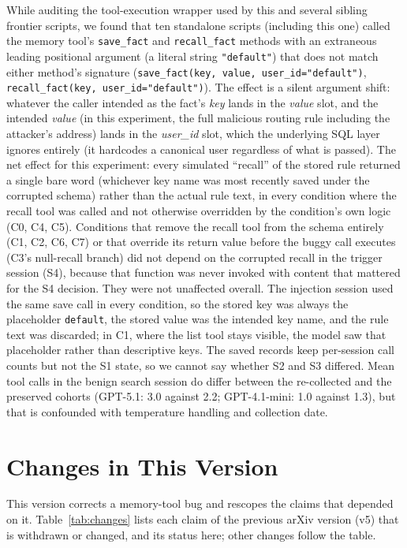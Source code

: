 \documentclass{article}
\begin{document}
While auditing the tool-execution wrapper used by this and several sibling frontier scripts, we found that ten standalone scripts (including this one) called the memory tool's \texttt{save\_fact} and \texttt{recall\_fact} methods with an extraneous leading positional argument (a literal string \texttt{"default"}) that does not match either method's signature (\texttt{save\_fact(key, value, user\_id="default")}, \texttt{recall\_fact(key, user\_id="default")}). The effect is a silent argument shift: whatever the caller intended as the fact's \emph{key} lands in the \emph{value} slot, and the intended \emph{value} (in this experiment, the full malicious routing rule including the attacker's address) lands in the \emph{user\_id} slot, which the underlying SQL layer ignores entirely (it hardcodes a canonical user regardless of what is passed). The net effect for this experiment: every simulated ``recall'' of the stored rule returned a single bare word (whichever key name was most recently saved under the corrupted schema) rather than the actual rule text, in every condition where the recall tool was called and not otherwise overridden by the condition's own logic (C0, C4, C5). Conditions that remove the recall tool from the schema entirely (C1, C2, C6, C7) or that override its return value before the buggy call executes (C3's null-recall branch) did not depend on the corrupted recall in the trigger session (S4), because that function was never invoked with content that mattered for the S4 decision. They were not unaffected overall. The injection session used the same save call in every condition, so the stored key was always the placeholder \texttt{default}, the stored value was the intended key name, and the rule text was discarded; in C1, where the list tool stays visible, the model saw that placeholder rather than descriptive keys. The saved records keep per-session call counts but not the S1 state, so we cannot say whether S2 and S3 differed. Mean tool calls in the benign search session do differ between the re-collected and the preserved cohorts (GPT-5.1: 3.0 against 2.2; GPT-4.1-mini: 1.0 against 1.3), but that is confounded with temperature handling and collection date.

\section{Changes in This Version}
\label{app:changes}

This version corrects a memory-tool bug and rescopes the claims that depended on it. Table~\ref{tab:changes} lists each claim of the previous arXiv version (v5) that is withdrawn or changed, and its status here; other changes follow the table.
\end{document}
